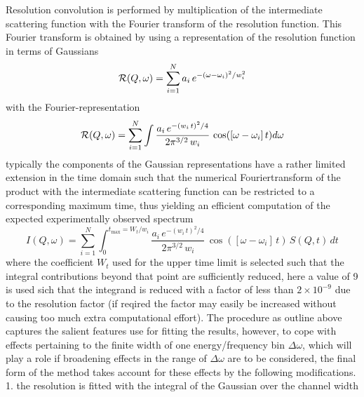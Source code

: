 \documentclass[12pt]{article}
\begin{document}
Resolution convolution is performed by multiplication of the intermediate scattering function with the
Fourier transform of the resolution function. This Fourier transform is obtained by using a representation 
of the resolution function in terms of Gaussians
\begin{equation}
\label{eg:gares}
{\cal R}(Q,\omega) = \sum_{i=1}^{N} { a_i \, e^{-(\omega-\omega_i)^2/w_i^2} }
\end{equation}
with the Fourier-representation
\begin{equation}
\label{eg:garesF}
{\cal R}(Q,\omega) = \sum_{i=1}^{N} {\int \frac{a_i \, e^{-(w_i \, t)^2/4}}{ 2 \pi^{3/2} \, w_i }\, \cos([\omega-\omega_i]\,t) d\omega}
\end{equation}
typically the components of the Gaussian representations have a rather limited extension in
the time domain such that the numerical Fouriertransform of the product with the intermediate
scattering function can be restricted to a corresponding maximum time, thus yielding an 
efficient computation of the expected experimentally observed spectrum
\begin{equation}
\label{eq:conv1}
I(Q,\omega) = \sum_{i=1}^{N} { \int_0^{t_{\max} = W_t/w_i} {
\frac{a_i \, e^{-(w_i \, t)^2/4}}{ 2 \pi^{3/2} \, w_i } \, \cos([\omega-\omega_i]\, t) \, S(Q,t) \, dt 
}}
\end{equation}
where the coefficient $W_t$ used for the upper time limit is selected such that the integral
contributions beyond that point are sufficiently reduced, 
here a value of 9 is used sich that the integrand is reduced with a factor of less than $2 \times 10^{-9}$ 
due to the resolution
factor (if reqired the factor may easily be increased without causing too much extra computational effort). 
The procedure as outline above captures the salient features use for fitting the results,
however, to cope with effects pertaining to the finite width of one energy/frequency bin
$\Delta \omega$, which will play a role if broadening effects in the range of $\Delta \omega$
are to be considered, the final form of the method takes account for these effects by the
following modifications.
1. the resolution is fitted with the integral of the Gaussian over the channel width 
%
\end{document}
